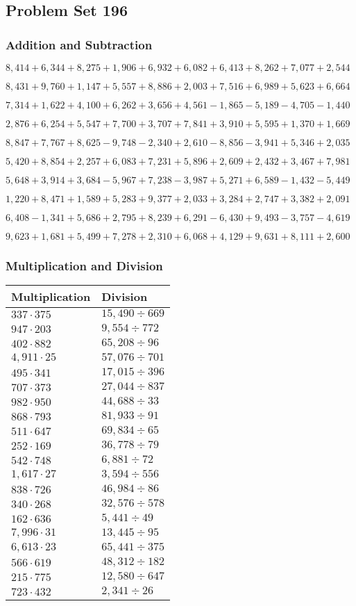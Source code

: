 \hypertarget{problem-set-196}{%
\subsection{Problem Set 196}\label{problem-set-196}}

\hypertarget{addition-and-subtraction}{%
\subsubsection{Addition and
Subtraction}\label{addition-and-subtraction}}

\(8,414+6,344+8,275+1,906+6,932+6,082+6,413+8,262+7,077+2,544\)

\(8,431+9,760+1,147+5,557+8,886+2,003+7,516+6,989+5,623+6,664\)

\(7,314+1,622+4,100+6,262+3,656+4,561-1,865-5,189-4,705-1,440\)

\(2,876+6,254+5,547+7,700+3,707+7,841+3,910+5,595+1,370+1,669\)

\(8,847+7,767+8,625-9,748-2,340+2,610-8,856-3,941+5,346+2,035\)

\(5,420+8,854+2,257+6,083+7,231+5,896+2,609+2,432+3,467+7,981\)

\(5,648+3,914+3,684-5,967+7,238-3,987+5,271+6,589-1,432-5,449\)

\(1,220+8,471+1,589+5,283+9,377+2,033+3,284+2,747+3,382+2,091\)

\(6,408-1,341+5,686+2,795+8,239+6,291-6,430+9,493-3,757-4,619\)

\(9,623+1,681+5,499+7,278+2,310+6,068+4,129+9,631+8,111+2,600\)

\hypertarget{multiplication-and-division}{%
\subsubsection{Multiplication and
Division}\label{multiplication-and-division}}

\begin{longtable}[]{@{}ll@{}}
\toprule
Multiplication & Division\tabularnewline
\midrule
\endhead
\(337\cdot375\) & \(15,490÷669\)\tabularnewline
\(947\cdot203\) & \(9,554÷772\)\tabularnewline
\(402\cdot882\) & \(65,208÷96\)\tabularnewline
\(4,911\cdot25\) & \(57,076÷701\)\tabularnewline
\(495\cdot341\) & \(17,015÷396\)\tabularnewline
\(707\cdot373\) & \(27,044÷837\)\tabularnewline
\(982\cdot950\) & \(44,688÷33\)\tabularnewline
\(868\cdot793\) & \(81,933÷91\)\tabularnewline
\(511\cdot647\) & \(69,834÷65\)\tabularnewline
\(252\cdot169\) & \(36,778÷79\)\tabularnewline
\(542\cdot748\) & \(6,881÷72\)\tabularnewline
\(1,617\cdot27\) & \(3,594÷556\)\tabularnewline
\(838\cdot726\) & \(46,984÷86\)\tabularnewline
\(340\cdot268\) & \(32,576÷578\)\tabularnewline
\(162\cdot636\) & \(5,441÷49\)\tabularnewline
\(7,996\cdot31\) & \(13,445÷95\)\tabularnewline
\(6,613\cdot23\) & \(65,441÷375\)\tabularnewline
\(566\cdot619\) & \(48,312÷182\)\tabularnewline
\(215\cdot775\) & \(12,580÷647\)\tabularnewline
\(723\cdot432\) & \(2,341÷26\)\tabularnewline
\bottomrule
\end{longtable}
